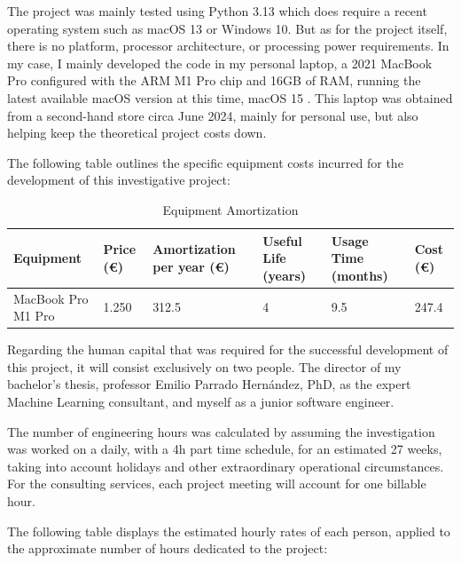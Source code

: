 \documentclass[12pt]{report} %
\begin{document}
The project was mainly tested using Python 3.13 \cite{python3.13} which does require a recent operating system such as macOS 13 or Windows 10. But as for the project itself, there is no platform, processor architecture, or processing power requirements. In my case, I mainly developed the code in my personal laptop, a 2021 MacBook Pro configured with the ARM M1 Pro chip and 16GB of RAM, running the latest available macOS version at this time, macOS 15 \cite{macos}. This laptop was obtained from a second-hand store circa June 2024, mainly for personal use, but also helping keep the theoretical project costs down.

The following table outlines the specific equipment costs incurred for the development of this investigative project:
\begin{table}[H]
	\caption{Equipment Amortization}
	\centering
	\begin{tabular}{|P{2.8cm}|P{1.8cm}|P{2.5cm}|P{1.5cm}|P{2cm}|P{1.5cm}|}
		\hline
		\textbf{Equipment} & \textbf{Price (€)} & \textbf{Amortization per year (€)} & \textbf{Useful Life (years)} & \textbf{Usage Time (months)} & \textbf{Cost (€)} \\
		\hline
		MacBook Pro M1 Pro & 1.250 & 312.5 & 4 & 9.5 & 247.4 \\
		\hline
	\end{tabular}
\end{table}

Regarding the human capital that was required for the successful development of this project, it will consist exclusively on two people. The director of my bachelor's thesis, professor Emilio Parrado Hernández, PhD, as the expert Machine Learning consultant, and myself as a junior software engineer. 

The number of engineering hours was calculated by assuming the investigation was worked on a daily, with a 4h part time schedule, for an estimated 27 weeks, taking into account holidays and other extraordinary operational circumstances. For the consulting services, each project meeting will account for one billable hour.

The following table displays the estimated hourly rates of each person, applied to the approximate number of hours dedicated to the project:
            
\end{document}
